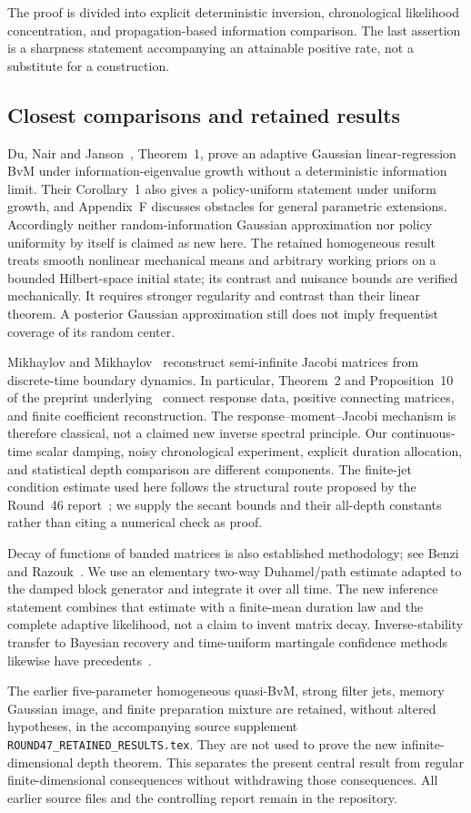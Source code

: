 The proof is divided into explicit deterministic inversion, chronological
likelihood concentration, and propagation-based information comparison. The
last assertion is a sharpness statement accompanying an attainable positive
rate, not a substitute for a construction.

\subsection{Closest comparisons and retained results}
Du, Nair and Janson~\cite{DNJ2025}, Theorem~1, prove an adaptive Gaussian
linear-regression BvM under information-eigenvalue growth without a deterministic
information limit. Their Corollary~1 also gives a policy-uniform statement under
uniform growth, and Appendix~F discusses obstacles for general parametric
extensions. Accordingly neither random-information Gaussian approximation nor
policy uniformity by itself is claimed as new here. The retained homogeneous
result treats smooth nonlinear mechanical means and arbitrary working priors
on a bounded Hilbert-space initial state; its contrast and nuisance bounds
are verified mechanically. It requires stronger regularity and contrast than
their linear theorem. A posterior Gaussian approximation still does not imply
frequentist coverage of its random center.

Mikhaylov and Mikhaylov~\cite{MM2019,MM2020} reconstruct semi-infinite Jacobi
matrices from discrete-time boundary dynamics. In particular, Theorem~2 and
Proposition~10 of the preprint underlying~\cite{MM2020} connect response data,
positive connecting matrices, and finite coefficient reconstruction. The
response--moment--Jacobi mechanism is therefore classical, not a claimed new
inverse spectral principle. Our continuous-time scalar damping, noisy
chronological experiment, explicit duration allocation, and statistical depth
comparison are different components. The finite-jet condition estimate used
here follows the structural route proposed by the Round~46 report~\cite{R46};
we supply the secant bounds and their all-depth constants rather than citing a
numerical check as proof.

Decay of functions of banded matrices is also established methodology; see
Benzi and Razouk~\cite{BR2007}. We use an elementary two-way Duhamel/path estimate
adapted to the damped block generator and integrate it over all time. The
new inference statement combines that estimate with a finite-mean duration law
and the complete adaptive likelihood, not a claim to invent matrix decay.
Inverse-stability transfer to Bayesian recovery and time-uniform martingale
confidence methods likewise have precedents~\cite{Vollmer,Howard}.

The earlier five-parameter homogeneous quasi-BvM, strong filter jets, memory
Gaussian image, and finite preparation mixture are retained, without altered
hypotheses, in the accompanying source supplement
\texttt{ROUND47\_RETAINED\_RESULTS.tex}. They are not used to prove the new
infinite-dimensional depth theorem. This separates the present central result
from regular finite-dimensional consequences without withdrawing those
consequences. All earlier source files and the controlling report remain in
the repository.


